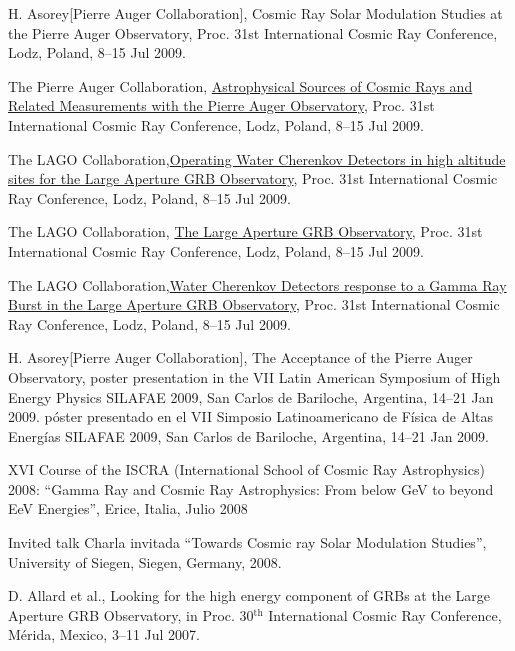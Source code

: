\begin{etaremune}
\item {}H. Asorey[Pierre Auger Collaboration], {{Cosmic Ray Solar
Modulation Studies at the Pierre Auger Observatory}}, \en Proc.
31st
International Cosmic Ray Conference, Lodz, Poland, 8--15 Jul 2009.

\item {}The Pierre Auger Collaboration,
\href{http://arxiv.org/abs/0906.2347}{{Astrophysical Sources of Cosmic
Rays and Related Measurements with the Pierre Auger Observatory}}, \en Proc.
31st International Cosmic Ray Conference, Lodz, Poland, 8--15 Jul 2009.

\item {}The LAGO Collaboration,\href{http://arxiv.org/abs/0906.0814}{{Operating Water Cherenkov Detectors in high altitude sites for the Large Aperture GRB Observatory}}, \en Proc.
31st International Cosmic Ray Conference, Lodz, Poland, 8--15 Jul 2009.

\item {}The LAGO Collaboration,
\href{http://arxiv.org/abs/0906.0816}{{The Large Aperture GRB
Observatory}}, \en Proc.
31st International Cosmic Ray Conference, Lodz,
Poland, 8--15 Jul 2009.

\item {}The LAGO Collaboration,\href{http://arxiv.org/abs/0906.0820}{{Water Cherenkov Detectors response to a Gamma Ray Burst in the Large Aperture GRB Observatory}}, \en Proc.
31st International Cosmic Ray Conference, Lodz, Poland, 8--15 Jul 2009.
\item {}H. Asorey[Pierre Auger Collaboration], {{The Acceptance of the
Pierre Auger Observatory}}, 
\ifeng
poster presentation in the VII Latin American Symposium of High Energy Physics SILAFAE 2009, San Carlos de Bariloche, Argentina, 14--21 Jan 2009.
\else
póster presentado en el VII Simposio Latinoamericano de Física de Altas Energías SILAFAE 2009, San Carlos de Bariloche, Argentina, 14--21 Jan 2009.
\fi

\item {}XVI Course of the ISCRA (International School of Cosmic Ray Astrophysics) 2008: ``Gamma Ray and Cosmic Ray Astrophysics: From below GeV to beyond EeV Energies'', Erice, Italia, Julio 2008

\item {}\ifeng Invited talk \else Charla invitada \fi ``Towards Cosmic ray Solar Modulation Studies'', University of Siegen, Siegen, Germany, 2008.

\item {}D. Allard { et al.}, {{Looking for the high energy component of GRBs at the Large Aperture GRB Observatory}}, in Proc.
30$^{\mathrm{th}}$ International Cosmic Ray Conference,  Mérida, Mexico, 3--11 Jul 2007.


\end{etaremune}
